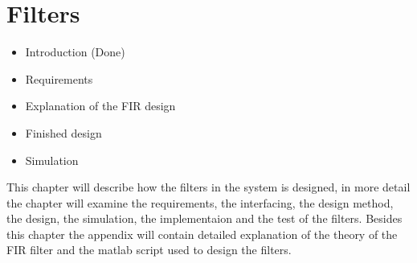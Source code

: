\chapter{Filters}

\begin{itemize}
\item Introduction (Done)
\item Requirements
\item Explanation of the FIR design 
\item Finished design 
\item Simulation 
\end{itemize} 

This chapter will describe how the filters in the system is designed, in more detail the chapter will examine the requirements, the interfacing, the design method, the design, the simulation, the implementaion and the test of the filters. Besides this chapter the appendix will contain detailed explanation of the theory of the FIR filter and the matlab script used to design the filters.       







%

%